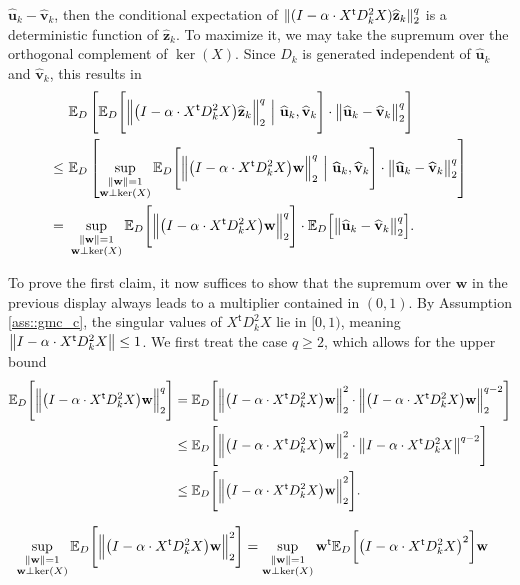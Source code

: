 \documentclass{article}
\newcommand*{\E}{\mathbb{E}} %
\newcommand*{\bfu}{\mathbf{u}}
\newcommand*{\bfv}{\mathbf{v}}
\newcommand*{\bfw}{\mathbf{w}}
\newcommand*{\bfz}{\mathbf{z}}
\newcommand*{\tran}{^{\mathsf{t}}}
\newcommand*{\Bigmid}{\ \Big\vert\ }
\DeclarePairedDelimiter{\norm}{\lVert}{\rVert}
\newcommand{\whu}{\widehat{\bfu}}
\newcommand{\whv}{\widehat{\bfv}}
\begin{document}
$\whu_k - \whv_k$, then the conditional expectation of $\norm{(I - \alpha \cdot
X\tran D_k^2 X) \widehat{\bfz}_k}_2^q$ is a deterministic function of
$\widehat{\bfz}_k$. To maximize it, we may take the supremum over the orthogonal
complement of $\ker(X)$. Since $D_k$ is generated independent of $\whu_k$ and
$\whv_k$, this results in \begin{align*}
  &\E_D\left[\E_D\Bigg[\norm[\Big]{\big(I - \alpha \cdot X\tran D_k^2 X\big)
  \widehat{\bfz}_k}_2^q \Bigmid \whu_k, \whv_k \Bigg] \cdot \norm[\big]{\whu_k -
  \whv_k}^q_2 \right]\\
  \leq\ &\E_D\left[\sup_{\substack{\norm{\bfw} = 1\\ \bfw \perp \ker(X)}}
  \E_D\Bigg[\norm[\Big]{\big(I - \alpha \cdot X\tran D_k^2 X\big) \bfw}_2^q
  \Bigmid \whu_k, \whv_k \Bigg] \cdot \norm[\big]{\whu_k - \whv_k}^q_2 \right]\\
  =\ &\sup_{\substack{\norm{\bfw} = 1\\ \bfw \perp \ker(X)}}
  \E_D\Bigg[\norm[\Big]{\big(I - \alpha \cdot X\tran D_k^2 X\big)
  \bfw}_2^q\Bigg] \cdot \E_D\Big[\norm[\big]{\whu_k - \whv_k}^q_2\Big].
\end{align*}

To prove the first claim, it now suffices to show that the supremum over $\bfw$
in the previous display always leads to a multiplier contained in $(0, 1)$. By
Assumption \ref{ass::gmc_c}, the singular values of $X\tran D_k^2 X$ lie in $[0,
1)$, meaning $\norm[\big]{I - \alpha \cdot X\tran D_k^2 X} \leq 1$. We first
treat the case $q \geq 2$, which allows for the upper bound \begin{align*}
  \E_D\Bigg[\norm[\Big]{\big(I - \alpha \cdot X\tran D_k^2 X\big)
  \bfw}_2^q\Bigg] &= \E_D\Bigg[\norm[\Big]{\big(I - \alpha \cdot X\tran D_k^2
  X\big) \bfw}_2^2 \cdot \norm[\Big]{\big(I - \alpha \cdot X\tran D_k^2 X\big)
  \bfw}_2^{q - 2}\Bigg]\\
  &\leq \E_D\Bigg[\norm[\Big]{\big(I - \alpha \cdot X\tran D_k^2 X\big)
  \bfw}_2^2 \cdot \norm[\big]{I - \alpha \cdot X\tran D_k^2 X}^{q - 2}\Bigg]\\
  &\leq \E_D\Bigg[\norm[\Big]{\big(I - \alpha \cdot X\tran D_k^2 X\big)
  \bfw}_2^2\Bigg].
\end{align*}

\begin{align*}
  \sup_{\substack{\norm{\bfw} = 1\\ \bfw \perp \ker(X)}}
  \E_D\Bigg[\norm[\Big]{\big(I - \alpha \cdot X\tran D_k^2 X\big)
  \bfw}_2^2\Bigg] &= \sup_{\substack{\norm{\bfw} = 1\\ \bfw \perp \ker(X)}}
  \bfw\tran \E_D\bigg[\big(I - \alpha \cdot X\tran D_k^2 X\big)^2\bigg] \bfw
\end{align*}
\end{document}
